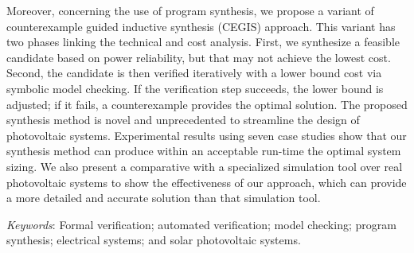 Moreover, concerning the use of program synthesis, we propose a variant of counterexample guided inductive synthesis (CEGIS) approach. This variant has two phases linking the technical and cost analysis. First, we synthesize a feasible candidate based on power reliability, but that may not achieve the lowest cost. Second, the candidate is then verified iteratively with a lower bound cost via symbolic model checking. If the verification step succeeds, the lower bound is adjusted; if it fails, a counterexample provides the optimal solution. The proposed synthesis method is novel and unprecedented to streamline the design of photovoltaic systems. Experimental results using seven case studies show that our synthesis method can produce within an acceptable run-time the optimal system sizing. We also present a comparative with a specialized simulation tool over real photovoltaic systems to show the effectiveness of our approach, which can provide a more detailed and accurate solution than that simulation tool.

\textit{Keywords}: Formal verification; automated verification; model checking; program synthesis; electrical systems; and solar photovoltaic systems.
